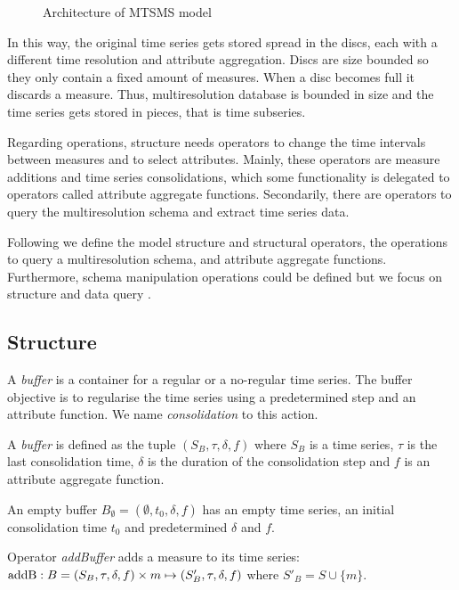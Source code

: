 \begin{figure}
  \centering
  
  \caption{Architecture of MTSMS model}
  \label{fig:model:mtsdb}
\end{figure}


In this way, the original time series gets stored spread in the discs,
each with a different time resolution and attribute aggregation.
Discs are size bounded so they only contain a fixed amount of
measures. When a disc becomes full it discards a measure. Thus,
multiresolution database is bounded in size and the time series gets
stored in pieces, that is time subseries.

Regarding operations,  structure needs operators to change
the time intervals between measures and to select attributes. Mainly,
these operators are measure additions and time series consolidations,
which some functionality is delegated to operators called attribute
aggregate functions. Secondarily, there are operators to query the
multiresolution schema and extract time series data.


Following we define the  model structure and structural
operators, the operations to query a multiresolution schema, and
attribute aggregate functions.  Furthermore, schema manipulation
operations could be defined but we focus on structure and data query .


\subsection{Structure}

A \emph{buffer} is a container for a regular or a no-regular time
series. The buffer objective is to regularise the time series using a
predetermined step and an attribute function. We name
\emph{consolidation} to this action.
\begin{definition}%
  A \emph{buffer} is defined as the tuple $(S_B,\tau,\delta,f)$ where
  $S_B$ is a time series, $\tau$ is the last consolidation time,
  $\delta$ is the duration of the consolidation step and $f$ is an
  attribute aggregate function.

  An empty buffer $B_{\emptyset} = (\emptyset,t_0, \delta, f)$ has an
  empty time series, an initial consolidation time $t_0$ and
  predetermined $\delta$ and $f$.
\end{definition}

Operator \emph{addBuffer} adds a measure to its time series:
$\operatorname{addB}: B = (S_B,\tau,\delta,f) \times m \mapsto
(S'_B,\tau,\delta,f)$ where $S'_B = S \cup \{m\} $.

